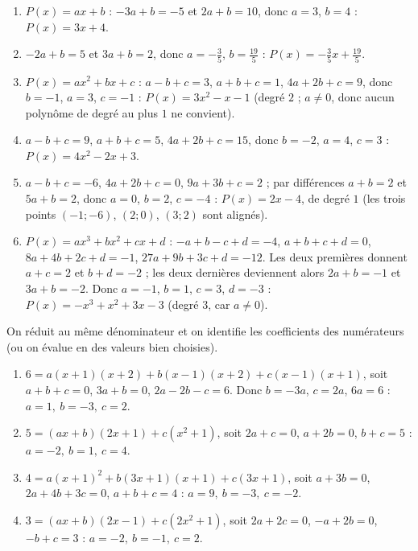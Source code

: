 \begin{corrige}
\begin{sol}
\begin{enumerate}
\item $P(x) = ax + b$ : $-3a + b = -5$ et $2a + b = 10$, donc $a = 3$, $b = 4$ : $P(x) = 3x + 4$.
\item $-2a + b = 5$ et $3a + b = 2$, donc $a = -\frac{3}{5}$, $b = \frac{19}{5}$ : $P(x) = -\frac{3}{5}x + \frac{19}{5}$.
\item $P(x) = ax^2 + bx + c$ : $a - b + c = 3$, $a + b + c = 1$, $4a + 2b + c = 9$, donc $b = -1$, $a = 3$, $c = -1$ :
      $P(x) = 3x^2 - x - 1$ (degr\'e $2$ ; $a \neq 0$, donc aucun polyn\^ome de degr\'e au plus $1$ ne convient).
\item $a - b + c = 9$, $a + b + c = 5$, $4a + 2b + c = 15$, donc $b = -2$, $a = 4$, $c = 3$ : $P(x) = 4x^2 - 2x + 3$.
\item $a - b + c = -6$, $4a + 2b + c = 0$, $9a + 3b + c = 2$ ; par diff\'erences $a + b = 2$ et $5a + b = 2$, donc $a = 0$, $b = 2$, $c = -4$ :
      $P(x) = 2x - 4$, de degr\'e $1$ (les trois points $(-1;-6)$, $(2;0)$, $(3;2)$ sont align\'es).
\item $P(x) = ax^3 + bx^2 + cx + d$ : $-a + b - c + d = -4$, $a + b + c + d = 0$, $8a + 4b + 2c + d = -1$, $27a + 9b + 3c + d = -12$.
      Les deux premi\`eres donnent $a + c = 2$ et $b + d = -2$ ; les deux derni\`eres deviennent alors $2a + b = -1$ et $3a + b = -2$.
      Donc $a = -1$, $b = 1$, $c = 3$, $d = -3$ : $P(x) = -x^3 + x^2 + 3x - 3$ (degr\'e $3$, car $a \neq 0$).
\end{enumerate}
\end{sol}
%
\begin{sol}
On r\'eduit au m\^eme d\'enominateur et on identifie les coefficients des num\'erateurs (ou on \'evalue en des valeurs bien choisies).
\begin{enumerate}
\item $6 = a(x+1)(x+2) + b(x-1)(x+2) + c(x-1)(x+1)$, soit
      $a + b + c = 0$, $3a + b = 0$, $2a - 2b - c = 6$. Donc $b = -3a$, $c = 2a$, $6a = 6$ :
      $\boxed{a = 1,\ b = -3,\ c = 2}$.
\item $5 = (ax+b)(2x+1) + c(x^2+1)$, soit $2a + c = 0$, $a + 2b = 0$, $b + c = 5$ :
      $\boxed{a = -2,\ b = 1,\ c = 4}$.
\item $4 = a(x+1)^2 + b(3x+1)(x+1) + c(3x+1)$, soit $a + 3b = 0$, $2a + 4b + 3c = 0$, $a + b + c = 4$ :
      $\boxed{a = 9,\ b = -3,\ c = -2}$.
\item $3 = (ax+b)(2x-1) + c(2x^2+1)$, soit $2a + 2c = 0$, $-a + 2b = 0$, $-b + c = 3$ :
      $\boxed{a = -2,\ b = -1,\ c = 2}$.
\end{enumerate}
\end{sol}
\end{corrige}
